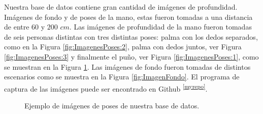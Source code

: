 Nuestra base de datos contiene gran cantidad de imágenes de profundidad. Imágenes de fondo y de poses de la mano, estas fueron tomadas a una distancia de entre $60$ y $200$ $cm$. Las imágenes de profundidad de la mano fueron tomadas de seis personas distintas con tres distintas poses: palma con los dedos separados, como en la Figura \ref{fig:ImagenesPoses:2}, palma con dedos juntos, ver Figura \ref{fig:ImagenesPoses:3} y finalmente el pu\~no, ver Figura \ref{fig:ImagenesPoses:1}, como se muestran en la Figura \ref{fig:ImagenesPoses}. Las imágenes de fondo fueron tomadas de distintos escenarios como se muestra en la Figura \ref{fig:ImagenFondo}. El programa de captura de las imágenes puede ser encontrado en Github \textsuperscript{\ref{myrepo}}.  

\begin{figure}[h!]
\begin{center}
      \quad
{}   \quad
{}
\end{center}
\caption{Ejemplo de imágenes de poses de nuestra base de datos.}
\label{fig:ImagenesPoses}
\end{figure}  

